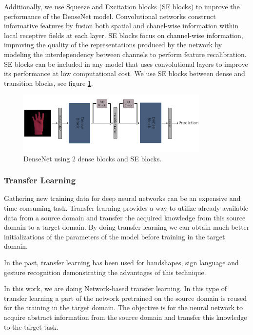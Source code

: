 Additionally, we use Squeeze and Excitation blocks (SE blocks) \cite{Hu2017SqueezeandExcitationN} to improve the performance of the DenseNet model. Convolutional networks construct informative features by fusion both spatial and chanel-wise information within local receptive fields at each layer. SE blocks focus on  channel-wise information, improving the quality of the representations produced by the network by modeling the interdependency between channels to perform feature recalibration. SE blocks can be included in any model that uses convolutional layers to improve its performance at low computational cost. We use SE blocks between dense and transition blocks, see figure \ref{fig:densenet}.

\begin{figure}[!ht]
    \centerline{\includegraphics[width=0.85\textwidth]{images/background/densenet.png}}
    \caption{DenseNet using 2 dense blocks and SE blocks.}
    \label{fig:densenet}
\end{figure}

\subsubsection{Transfer Learning} \label{models:tl}

Gathering new training data for deep neural networks can be an expensive and time consuming task. Transfer learning provides a way to utilize already available data from a source domain and transfer the acquired knowledge from this source domain to a target domain. By doing transfer learning we can obtain much better initializations of the parameters of the model before training in the target domain. 

In the past, transfer learning has been used for handshapes, sign language and gesture recognition \cite{farhadi2007}\cite{quiroga2017study}\cite{allard2017} demonstrating the advantages of this technique. 

In this work,  we are doing Network-based \cite{tan2018} transfer learning. In this type of transfer learning a part of the network pretrained on the source domain is reused for the training in the target domain. The objective is for the neural network to acquire abstract information from the source domain and transfer this knowledge to the target task.

